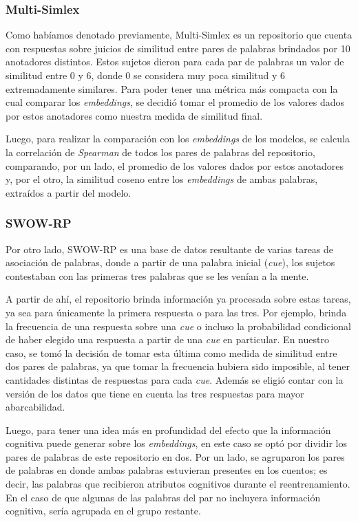 \subsubsection{Multi-Simlex}

Como habíamos denotado previamente, Multi-Simlex es un repositorio que cuenta con respuestas 
sobre juicios de similitud entre pares de palabras brindados por 10 anotadores distintos. 
Estos sujetos dieron para cada par de palabras un valor de similitud entre $0$ y $6$, donde $0$ 
se considera muy poca similitud y $6$ extremadamente similares. Para poder tener una métrica 
más compacta con la cual comparar los \textit{embeddings}, se decidió tomar el promedio de los valores 
dados por estos anotadores como nuestra medida de similitud final.

Luego, para realizar la comparación con los \textit{embeddings} de los modelos, se calcula la correlación 
de \textit{Spearman} de todos los pares de palabras del repositorio, comparando, por un lado, el promedio 
de los valores dados por estos anotadores y, por el otro, la similitud coseno entre los 
\textit{embeddings} de ambas palabras, extraídos a partir del modelo.

\subsubsection{SWOW-RP}

Por otro lado, SWOW-RP es una base de datos resultante de varias tareas de asociación de palabras, 
donde a partir de una palabra inicial (\textit{cue}), los sujetos contestaban con las primeras tres 
palabras que se les venían a la mente.

A partir de ahí, el repositorio brinda información ya procesada sobre estas tareas, ya sea 
para únicamente la primera respuesta o para las tres. Por ejemplo, brinda la frecuencia de 
una respuesta sobre una \textit{cue} o incluso la probabilidad condicional de haber elegido una 
respuesta a partir de una \textit{cue} en particular. En nuestro caso, se tomó la decisión de tomar 
esta última como medida de similitud entre dos pares de palabras, ya que tomar la frecuencia 
hubiera sido imposible, al tener cantidades distintas de respuestas para cada \textit{cue}. Además se 
eligió contar con la versión de los datos que tiene en cuenta las tres respuestas para mayor 
abarcabilidad.

Luego, para tener una idea más en profundidad del efecto que la información cognitiva puede 
generar sobre los \textit{embeddings}, en este caso se optó por dividir los pares de palabras de este 
repositorio en dos. Por un lado, se agruparon los pares de palabras en donde ambas palabras 
estuvieran presentes en los cuentos; es decir, las palabras que recibieron atributos cognitivos 
durante el reentrenamiento. En el caso de que algunas de las palabras del par no incluyera 
información cognitiva, sería agrupada en el grupo restante.

